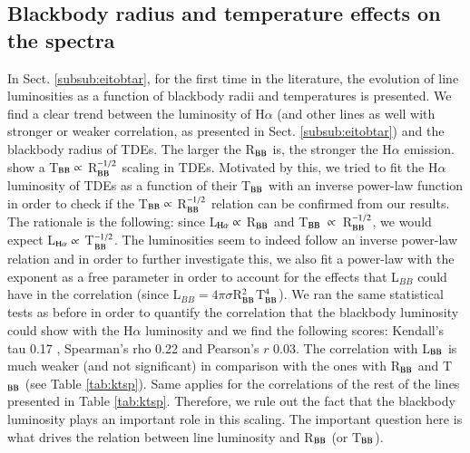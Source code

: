 \documentclass[structabstract]{aa}
\begin{document}
\subsection{Blackbody radius and temperature effects on the spectra} \label{subsec:dbb}
In Sect. \ref{subsub:eitobtar}, for the first time in the literature, the evolution of line luminosities as a function of blackbody radii and temperatures is presented. We find a clear trend between the luminosity of H$\alpha$ (and other lines as well with stronger or weaker correlation, as presented in Sect. \ref{subsub:eitobtar}) and the blackbody radius of TDEs. The larger the R$_{\rm BB}$ is, the stronger the H$\alpha$ emission. \citet{vanvelzen2021} show a T$_{\rm BB} \propto$ R$_{\rm BB}^{-1/2}$ scaling in TDEs. Motivated by this, we tried to fit the H$\alpha$ luminosity of TDEs as a function of their T$_{\rm BB}$ with an inverse power-law function in order to check if the T$_{\rm BB} \propto$ R$_{\rm BB}^{-1/2}$ relation can be confirmed from our results. The rationale is the following: since L$_{\rm H\alpha} \propto$ R$_{\rm BB}$ and T$_{\rm BB}~\propto$~R$_{\rm BB}^{-1/2}$, we would expect L$_{\rm H\alpha} \propto$ T$_{\rm BB}^{-1/2}$. The luminosities seem to indeed follow an inverse power-law relation and in order to further investigate this, we also fit a power-law with the exponent as a free parameter in order to account for the effects that L$_{BB}$ could have in the correlation (since L$_{BB}=4\pi\sigma$R$_{\rm BB}^{2}$T$_{\rm BB}^{4}$). We ran the same statistical tests as before in order to quantify the correlation that the blackbody luminosity could show with the H$\alpha$ luminosity and  we find the following scores: Kendall's tau 0.17 , Spearman's rho 0.22  and Pearson's $r$ 0.03. The correlation with L$_{\rm BB}$ is much weaker (and not significant) in comparison with the ones with R$_{\rm BB}$ and T$_{\rm BB}$ (see Table \ref{tab:ktsp}). Same applies for the correlations of the rest of the lines presented in Table \ref{tab:ktsp}. Therefore, we rule out the fact that the blackbody luminosity plays an important role in this scaling. The important question here is what drives the relation between line luminosity and R$_{\rm BB}$ (or T$_{\rm BB}$).
\end{document}
